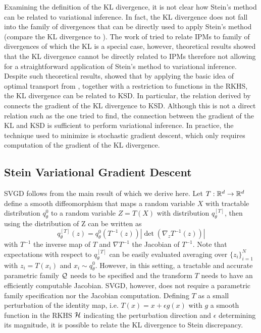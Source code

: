 Examining the definition of the KL divergence, it is not clear how Stein's method can be related to variational inference. In fact, the KL divergence does not fall into the family of divergences that can be directly used to apply Stein's method (compare the KL divergence to ). The work of \cite{sriperumbudur2009integral} tried to relate IPMs to family of divergences of which the KL is a special case, however, theoretical results showed that the KL divergence cannot be directly related to IPMs therefore not allowing for a straightforward application of Stein's method to variational inference. Despite such theoretical results, \cite{liu2016stein} showed that by applying the basic idea of optimal transport from , together with a restriction to functions in the RKHS, the KL divergence can be related to KSD. In particular, the relation derived by \cite{liu2016stein} connects the gradient of the KL divergence to KSD. Although this is not a direct relation such as the one \cite{sriperumbudur2009integral} tried to find, the connection between the gradient of the KL and KSD is sufficient to perform variational inference. In practice, the technique used to minimize  is stochastic gradient descent, which only requires computation of the gradient of the KL divergence. 

\subsection{Stein Variational Gradient Descent}
SVGD follows from the main result of \cite{liu2016stein} which we derive here. Let $T: \mathbb{R}^d \rightarrow \mathbb{R}^d$ define a smooth diffeomorphism that maps a random variable $X$ with tractable distribution $q_{\theta}^0$ to a random variable $Z = T(X)$ with distribution $q_{\theta}^{[T]}$, then using  the distribution of Z can be written as 
\begin{equation}\label{q_z}
q_{\theta}^{[T]}(z) = q_{\theta}^0(T^{-1}(z))|\det(\nabla_z T^{-1}(z))|
\end{equation}
with $T^{-1}$ the inverse map of $T$ and $\nabla T^{-1}$ the Jacobian of $T^{-1}$. Note that expectations with respect to $q_{\theta}^{[T]}$ can be easily evaluated averaging over $\{z_i\}_{i=1}^N$ with $z_i = T(x_i)$ and $x_i \sim q_{\theta}^0$. However, in this setting, a tractable and accurate parametric family $\mathcal{Q}$ needs to be specified and the transform $T$ needs to have an efficiently computable Jacobian. SVGD, however, does not require a parametric family specification nor the Jacobian computation. Defining $T$ as a small perturbation of the identity map, i.e. $T(x) = x + \epsilon g(x)$ with $g$ a smooth function in the RKHS $\mathcal{H}$ indicating the perturbation direction and $\epsilon$ determining its magnitude, it is possible to relate the KL divergence to Stein discrepancy.

